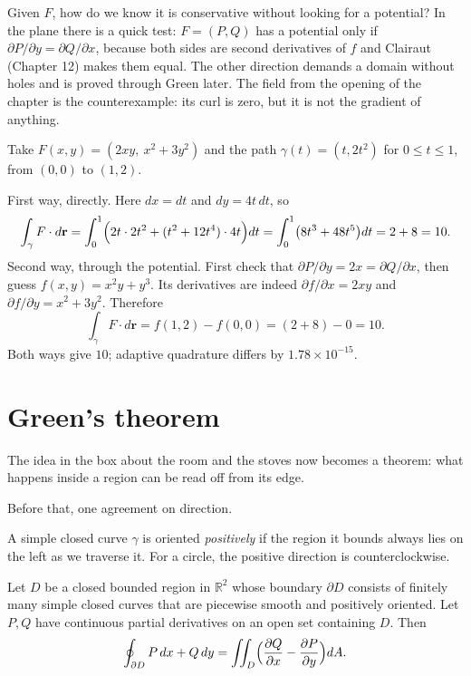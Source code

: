 Given $F$, how do we know it is conservative without looking for a potential? In
the plane there is a quick test: $F=(P,Q)$ has a potential only if $\partial P/\partial
y=\partial Q/\partial x$, because both sides are second derivatives of $f$ and Clairaut
(Chapter 12) makes them equal. The other direction demands a domain without holes and is
proved through Green later. The field from the opening of the chapter is the counterexample: its curl is zero,
but it is not the gradient of anything.

\begin{contoh}
 Take $F(x,y)=(2xy,\ x^{2}+3y^{2})$ and the path
$\gamma(t)=(t,2t^{2})$ for $0\le t\le1$, from $(0,0)$ to $(1,2)$.

First way, directly. Here $dx=dt$ and $dy=4t\,dt$, so
\[
\int_{\gamma}F\cdot d\mathbf{r}
=\int_{0}^{1}\Bigl(2t\cdot 2t^{2}+(t^{2}+12t^{4})\cdot 4t\Bigr)dt
=\int_{0}^{1}\bigl(8t^{3}+48t^{5}\bigr)dt=2+8=10 .
\]
Second way, through the potential. First check that $\partial P/\partial
y=2x=\partial Q/\partial x$, then guess $f(x,y)=x^{2}y+y^{3}$. Its derivatives
are indeed $\partial f/\partial x=2xy$ and $\partial f/\partial y=x^{2}+3y^{2}$.
Therefore
\[
\int_{\gamma}F\cdot d\mathbf{r}=f(1,2)-f(0,0)=(2+8)-0=10 .
\]
Both ways give $10$; adaptive quadrature differs by $1.78\times10^{-15}$.
\end{contoh}

\section{Green's theorem}

The idea in the box about the room and the stoves now becomes a theorem: what happens
inside a region can be read off from its edge.

Before that, one agreement on direction.

\begin{definisi}
 A simple closed curve $\gamma$ is oriented
\emph{positively} if the region it bounds always lies on the left
as we traverse it. For a circle, the positive direction is counterclockwise.
\end{definisi}

\begin{teorema}[Green]
Let $D$ be a closed bounded region in $\mathbb{R}^{2}$ whose boundary
$\partial D$ consists of finitely many simple closed curves that are piecewise
smooth and positively oriented. Let $P,Q$ have continuous partial
derivatives on an open set containing $D$. Then
\[
\oint_{\partial D}P\,dx+Q\,dy=\iint_{D}\Bigl(\frac{\partial Q}{\partial x}
-\frac{\partial P}{\partial y}\Bigr)dA .
\]
\end{teorema}

